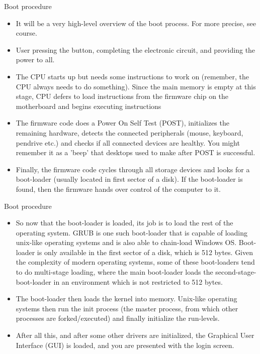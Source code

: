 \documentclass[usenames,dvipsnames,10pt,aspectratio=169]{beamer}
\begin{document}
\begin{frame}{Boot procedure}
    \begin{itemize}
        \item It will be a very high-level overview of the boot process. For more precise, see  course.
        \item User pressing the button, completing the electronic circuit, and providing the power to all.
        \item The CPU starts up but needs some instructions to work on (remember, the CPU always needs to do something). Since the main memory is empty at this stage, CPU defers to load instructions from the firmware chip on the motherboard and begins executing instructions
        \item The firmware code does a Power On Self Test (POST), initializes the remaining hardware, detects the connected peripherals (mouse, keyboard, pendrive etc.) and checks if all connected devices are healthy. You might remember it as a 'beep' that desktops used to make after POST is successful.
        \item Finally, the firmware code cycles through all storage devices and looks for a boot-loader (usually located in first sector of a disk). If the boot-loader is found, then the firmware hands over control of the computer to it.
    \end{itemize}
\end{frame}

\begin{frame}{Boot procedure}
    \begin{itemize}
        \item So now that the boot-loader is loaded, its job is to load the rest of the operating system. GRUB is one such boot-loader that is capable of loading unix-like operating systems and is also able to chain-load Windows OS. Boot-loader is only available in the first sector of a disk, which is 512 bytes. Given the complexity of modern operating systems, some of these boot-loaders tend to do multi-stage loading, where the main boot-loader loads the second-stage-boot-loader in an environment which is not restricted to 512 bytes.
        \item The boot-loader then loads the kernel into memory. Unix-like operating systems then run the init process (the master process, from which other processes are forked/executed) and finally initialize the run-levels.
        \item After all this, and after some other drivers are initialized, the Graphical User Interface (GUI) is loaded, and you are presented with the login screen.
    \end{itemize}
\end{frame}
\end{document}
